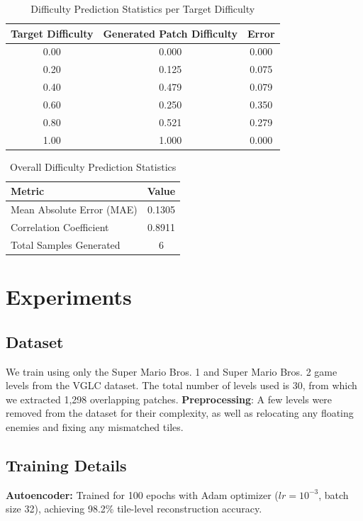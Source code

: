 \documentclass[conference]{IEEEtran}
\begin{document}
\FloatBarrier
\begin{table}[H]
\centering
\caption{Difficulty Prediction Statistics per Target Difficulty}
\label{tab:difficulty_stats_updated}
\begin{tabular}{|c|c|c|}
\hline
\textbf{Target Difficulty} & \textbf{Generated Patch Difficulty} & \textbf{Error} \\
\hline
0.00 & 0.000 & 0.000 \\
0.20 & 0.125 & 0.075 \\
0.40 & 0.479 & 0.079 \\
0.60 & 0.250 & 0.350 \\
0.80 & 0.521 & 0.279 \\
1.00 & 1.000 & 0.000 \\
\hline
\end{tabular}
\end{table}

\begin{table}[H]
\centering
\caption{Overall Difficulty Prediction Statistics}
\label{tab:overall_stats_updated}
\begin{tabular}{|l|c|}
\hline
\textbf{Metric} & \textbf{Value} \\
\hline
Mean Absolute Error (MAE) & 0.1305 \\
Correlation Coefficient  & 0.8911 \\
Total Samples Generated  & 6 \\
\hline
\end{tabular}
\end{table}
\section{Experiments}

\subsection{Dataset}
We train using only the Super Mario Bros. 1 and Super Mario Bros. 2 game levels from the VGLC dataset. The total number of levels used is 30, from which we extracted 1,298 overlapping patches. \textbf{Preprocessing}: A few levels were removed from the dataset for their complexity, as well as relocating any floating enemies and fixing any mismatched tiles.

\subsection{Training Details}
\textbf{Autoencoder:} Trained for 100 epochs with Adam optimizer ($lr=10^{-3}$, batch size 32), achieving 98.2\% tile-level reconstruction accuracy.
\end{document}
